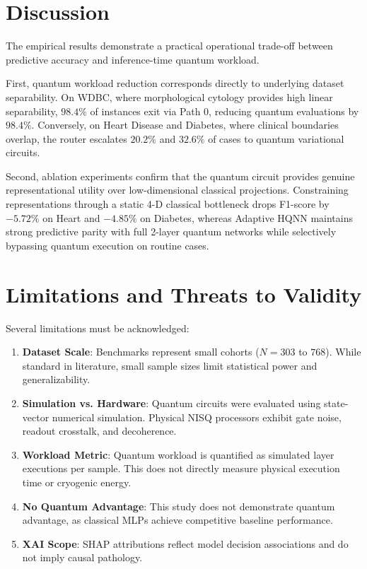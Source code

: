 \documentclass[conference]{IEEEtran}
\begin{document}
\section{Discussion}
The empirical results demonstrate a practical operational trade-off between predictive accuracy and inference-time quantum workload. 

First, quantum workload reduction corresponds directly to underlying dataset separability. On WDBC, where morphological cytology provides high linear separability, $98.4\%$ of instances exit via Path 0, reducing quantum evaluations by $98.4\%$. Conversely, on Heart Disease and Diabetes, where clinical boundaries overlap, the router escalates $20.2\%$ and $32.6\%$ of cases to quantum variational circuits.

Second, ablation experiments confirm that the quantum circuit provides genuine representational utility over low-dimensional classical projections. Constraining representations through a static 4-D classical bottleneck drops F1-score by $-5.72\%$ on Heart and $-4.85\%$ on Diabetes, whereas Adaptive HQNN maintains strong predictive parity with full 2-layer quantum networks while selectively bypassing quantum execution on routine cases.

\section{Limitations and Threats to Validity}
Several limitations must be acknowledged:
\begin{enumerate}
    \item \textbf{Dataset Scale}: Benchmarks represent small cohorts ($N=303$ to $768$). While standard in literature, small sample sizes limit statistical power and generalizability.
    \item \textbf{Simulation vs. Hardware}: Quantum circuits were evaluated using state-vector numerical simulation. Physical NISQ processors exhibit gate noise, readout crosstalk, and decoherence.
    \item \textbf{Workload Metric}: Quantum workload is quantified as simulated layer executions per sample. This does not directly measure physical execution time or cryogenic energy.
    \item \textbf{No Quantum Advantage}: This study does not demonstrate quantum advantage, as classical MLPs achieve competitive baseline performance.
    \item \textbf{XAI Scope}: SHAP attributions reflect model decision associations and do not imply causal pathology.
\end{enumerate}
\end{document}
